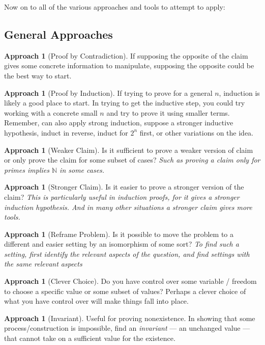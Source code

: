\documentclass[12pt]{amsart}
\theoremstyle{definition}
\newtheorem{approach}[theorem]{Approach}
\begin{document}
Now on to all of the various approaches and tools to attempt to apply:
\subsection{General Approaches}
\begin{approach}[Proof by Contradiction]
    If supposing the opposite of the claim gives some concrete information
    to manipulate, supposing the opposite could be the best way to start.
\end{approach}
\begin{approach}[Proof by Induction] If trying to prove for a general $n$,
    induction is likely a good place to start. In trying to get the
    inductive step, you could try working with a concrete small $n$ and try
    to prove it using smaller terms. Remember, can also apply strong
    induction, suppose a stronger inductive hypothesis, induct in reverse,
    induct for $2^n$ first, or other variations on the idea.
\end{approach}
\begin{approach}[Weaker Claim]
    Is it sufficient to prove a weaker version of claim or only prove the
    claim for some subset of cases? \textit{Such as proving a claim only
    for primes implies $\mathbb{N}$ in some cases.}
\end{approach}
\begin{approach}[Stronger Claim]
    Is it easier to prove a stronger version of the claim?  \textit{This is
    particularly useful in induction proofs, for it gives a stronger
    induction hypothesis. And in many other situations a stronger claim
    gives more tools.}
\end{approach}
\begin{approach}[Reframe Problem]
    Is it possible to move the problem to a different and easier setting by
    an isomorphism of some sort? \textit{To find such a setting, first
    identify the relevant aspects of the question, and find settings with
    the same relevant aspects}
\end{approach}
\begin{approach}[Clever Choice]
    Do you have control over some variable / freedom to choose a specific
    value or some subset of values? Perhaps a clever choice of what you
    have control over will make things fall into place.
\end{approach}
\begin{approach}[Invariant]
    Useful for proving nonexistence. In showing that some
    process/construction is impossible, find an \emph{invariant} --- an
    unchanged value --- that cannot take on a sufficient value for the
    existence.
\end{approach}
\end{document}
